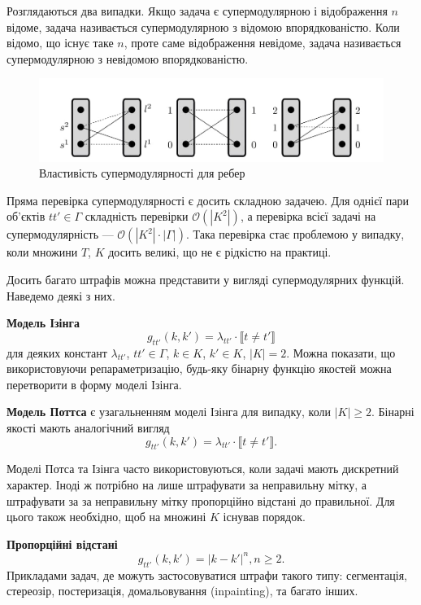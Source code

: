 Розглядаються два випадки. Якщо задача є супермодулярною і відображення $n$ відоме,
задача називається супермодулярною з відомою впорядкованістю. Коли відомо, що існує таке
$n$, проте саме відображення невідоме, задача називається супермодулярною з
невідомою впорядкованістю.
\begin{figure}[h]
  \centering
  \includegraphics[width=1\textwidth]{images/submodularity_ilustr.jpg}
  \caption{Властивість супермодулярності для ребер \cite{ishikawa}}
  \label{fig:submodularity_example}
\end{figure}
Пряма перевірка супермодулярності є досить складною задачею. Для
однієї пари об'єктів $tt'\in \Gamma$ складність перевірки
$\mathcal{O}(|K^2|)$, а перевірка всієї задачі на супермодулярність ---
$\mathcal{O}(|K^2|\cdot |\Gamma|)$. Така перевірка стає проблемою у випадку,
коли множини $T$, $K$ досить великі, що не є рідкістю на практиці.

Досить багато штрафів можна представити у вигляді супермодулярних
функцій. Наведемо деякі з них.

\textbf{Модель Ізінга}
\begin{equation*}
  g_{tt'}(k,k') = \lambda_{tt'}\cdot \llbracket t \neq t' \rrbracket
 \end{equation*}
для деяких констант $\lambda_{tt'}$, $tt'\in\Gamma$, $k\in K$, $k'\in K$, $\left\lvert K\right\rvert = 2$.
Можна показати, що використовуючи репараметризацію,
будь-яку бінарну функцію якостей можна перетворити в форму моделі Ізінга.

\textbf{Модель Поттса} є узагальненням моделі Ізінга для випадку, коли $|K|\geq 2$.
Бінарні якості мають аналогічний вигляд
\begin{equation*}
  g_{tt'}(k,k') = \lambda_{tt'}\cdot \llbracket t \neq t' \rrbracket.
\end{equation*}

Моделі Потса та Ізінга часто використовуються, коли задачі мають дискретний
характер. Іноді ж потрібно на лише штрафувати за неправильну мітку, а штрафувати
за за неправильну мітку пропорційно відстані до правильної. Для цього також
необхідно, щоб на множині $K$ існував порядок.

\textbf{Пропорційні відстані}
\begin{equation*}
  g_{tt'}(k,k') = |k - k'|^n, n\geq 2.
\end{equation*}
Прикладами задач, де можуть застосовуватися штрафи такого типу: сегментація,
стереозір, постеризація, домальовування (inpainting), та багато інших.

